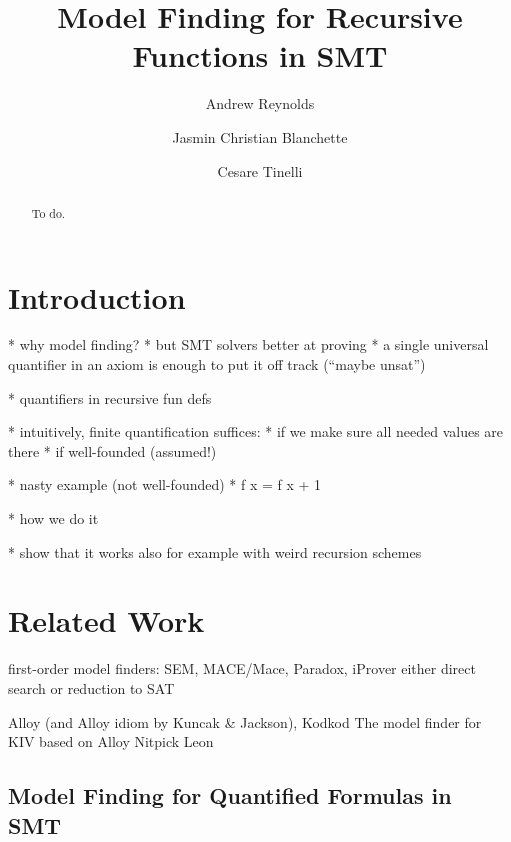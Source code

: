 \documentclass[runningheads,a4paper]{llncs}
\begin{document}
\title{Model Finding for Recursive Functions in SMT}

\author {Andrew Reynolds \and Jasmin Christian Blanchette \and Cesare Tinelli }

\maketitle

\begin{abstract}
To do.
\end{abstract}

\section{Introduction}
\label{sec:introduction}

  * why model finding?
  * but SMT solvers better at proving
    * a single universal quantifier in an axiom is enough to put it off track
      (``maybe unsat'')

  * quantifiers in recursive fun defs

  * intuitively, finite quantification suffices:
    * if we make sure all needed values are there
    * if well-founded (assumed!)

  * nasty example (not well-founded)
    * f x = f x + 1

  * how we do it

  * show that it works also for example with weird recursion schemes


\section{Related Work}

first-order model finders: SEM, MACE/Mace, Paradox, iProver
  either direct search or reduction to SAT

Alloy (and Alloy idiom by Kuncak \& Jackson), Kodkod
The model finder for KIV based on Alloy
Nitpick
Leon

\subsection{Model Finding for Quantified Formulas in SMT}
\end{document}
